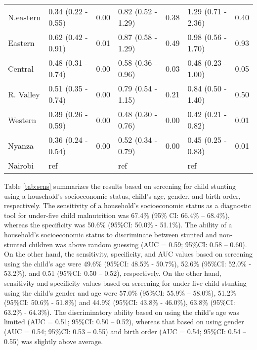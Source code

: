 \documentclass[sn-basic,Numbered,pdflatex]{sn-jnl}
\theoremstyle{remark}
\theoremstyle{definition}
\begin{document}
\begin{table}
\begin{tabular}[t]{>{\raggedright\arraybackslash}p{2cm}llllll}
\hspace{1em}N.eastern & 0.34 (0.22 - 0.55) & 0.00 & 0.82 (0.52 - 1.29) & 0.38 & 1.29 (0.71 - 2.36) & 0.40\\
\addlinespace
\hspace{1em}Eastern & 0.62 (0.42 - 0.91) & 0.01 & 0.87 (0.58 - 1.29) & 0.49 & 0.98 (0.56 - 1.70) & 0.93\\
\hspace{1em}Central & 0.48 (0.31 - 0.74) & 0.00 & 0.58 (0.36 - 0.96) & 0.03 & 0.48 (0.23 - 1.00) & 0.05\\
\hspace{1em}R. Valley & 0.51 (0.35 - 0.74) & 0.00 & 0.79 (0.54 - 1.15) & 0.21 & 0.84 (0.50 - 1.40) & 0.50\\
\hspace{1em}Western & 0.39 (0.26 - 0.59) & 0.00 & 0.48 (0.30 - 0.76) & 0.00 & 0.42 (0.21 - 0.82) & 0.01\\
\hspace{1em}Nyanza & 0.36 (0.24 - 0.54) & 0.00 & 0.52 (0.34 - 0.79) & 0.00 & 0.45 (0.25 - 0.83) & 0.01\\
\addlinespace
\hspace{1em}Nairobi & ref &  & ref &  & ref & \\
\bottomrule
\end{tabular}
\end{table}
\renewcommand{\arraystretch}{1}

Table \ref{tab:sens} summarizes the results based on screening for child
stunting using a household's socioeconomic status, child's age, gender,
and birth order, respectively. The sensitivity of a household's
socioeconomic status as a diagnostic tool for under-five child
malnutrition was 67.4\% (95\% CI: 66.4\% -- 68.4\%), whereas the
specificity was 50.6\% (95\%CI: 50.0\% - 51.1\%). The ability of a
household's socioeconomic status to discriminate between stunted and
non-stunted children was above random guessing (AUC = 0.59; 95\%CI: 0.58
-- 0.60). On the other hand, the sensitivity, specificity, and AUC
values based on screening using the child's age were 49.6\% (95\%CI:
48.5\% - 50.7\%), 52.6\% (95\%CI: 52.0\% - 53.2\%), and 0.51 (95\%CI:
0.50 -- 0.52), respectively. On the other hand, sensitivity and
specificity values based on screening for under-five child stunting
using the child's gender and age were 57.0\% (95\%CI: 55.9\% -- 58.0\%),
51.2\% (95\%CI: 50.6\% - 51.8\%) and 44.9\% (95\%CI: 43.8\% - 46.0\%),
63.8\% (95\%CI: 63.2\% - 64.3\%). The discriminatory ability based on
using the child's age was limited (AUC = 0.51; 95\%CI: 0.50 -- 0.52),
whereas that based on using gender (AUC = 0.54; 95\%CI: 0.53 -- 0.55)
and birth order (AUC = 0.54; 95\%CI: 0.54 -- 0.55) was slightly above
average.
\end{document}
